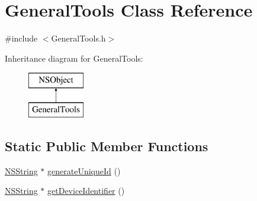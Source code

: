 \hypertarget{interface_general_tools}{
\section{\-General\-Tools \-Class \-Reference}
\label{interface_general_tools}
}


{\ttfamily \#include $<$\-General\-Tools.\-h$>$}

\-Inheritance diagram for \-General\-Tools\-:\begin{figure}[H]
\begin{center}
\leavevmode
\includegraphics[height=2.000000cm]{interface_general_tools}
\end{center}
\end{figure}
\subsection*{\-Static \-Public \-Member \-Functions}
\begin{DoxyCompactItemize}
\item 
\hyperlink{class_n_s_string}{\-N\-S\-String} $\ast$ \hyperlink{interface_general_tools_ae7b664bf9fcdc97043a88e45df24b993}{generate\-Unique\-Id} ()
\item 
\hyperlink{class_n_s_string}{\-N\-S\-String} $\ast$ \hyperlink{interface_general_tools_aba7436d27826be45e5523f38f6bd871b}{get\-Device\-Identifier} ()
\end{DoxyCompactItemize}


